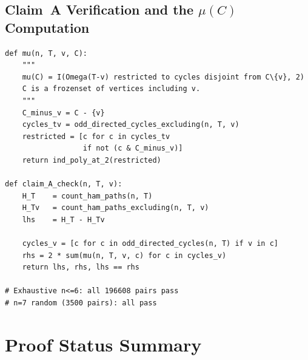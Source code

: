 \documentclass[12pt,reqno]{amsart}
\theoremstyle{plain}
\theoremstyle{definition}
\theoremstyle{remark}
\begin{document}
\subsection{Claim~A Verification and the $\mu(C)$ Computation}

\begin{lstlisting}[caption={Claim A verification with explicit mu(C) computation},
                   label=lst:claimA]
def mu(n, T, v, C):
    """
    mu(C) = I(Omega(T-v) restricted to cycles disjoint from C\{v}, 2)
    C is a frozenset of vertices including v.
    """
    C_minus_v = C - {v}
    cycles_tv = odd_directed_cycles_excluding(n, T, v)
    restricted = [c for c in cycles_tv 
                  if not (c & C_minus_v)]
    return ind_poly_at_2(restricted)

def claim_A_check(n, T, v):
    H_T    = count_ham_paths(n, T)
    H_Tv   = count_ham_paths_excluding(n, T, v)
    lhs    = H_T - H_Tv

    cycles_v = [c for c in odd_directed_cycles(n, T) if v in c]
    rhs = 2 * sum(mu(n, T, v, c) for c in cycles_v)
    return lhs, rhs, lhs == rhs

# Exhaustive n<=6: all 196608 pairs pass
# n=7 random (3500 pairs): all pass
\end{lstlisting}

\section{Proof Status Summary}
\label{app:status}
\end{document}
